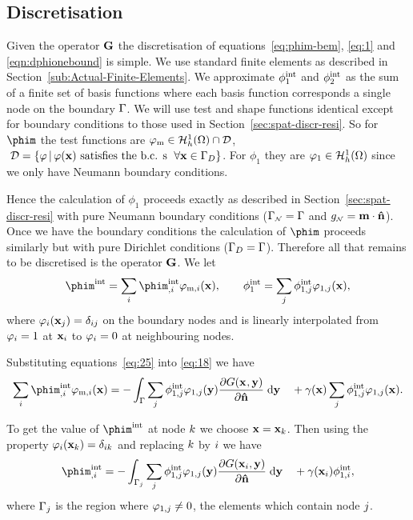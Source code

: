 \subsection{Discretisation}
\label{sec:discretisation}

Given the operator ${\mathbf{G}}$ the discretisation of equations~\eqref{eq:phim-bem}, \eqref{eq:1} and \eqref{eqn:dphionebound} is simple. We use standard finite elements as described in Section~\ref{sub:Actual-Finite-Elements}. We approximate $\phi^{\text{int}}_1$ and $\phi^{\text{int}}_2$ as the sum of a finite set of basis functions where each basis function corresponds a single node on the boundary ${\Gamma}$. We will use test and shape functions identical except for boundary conditions to those used in Section~\ref{sec:spat-discr-resi}. So for $\phim$ the test functions are $\varphi_{\text{m}} \in {\mathcal{H}^1_h(\Omega)} \cap \mathcal{D}$, $\;\mathcal{D} = \{ \varphi \,|\, \varphi(\mathbf{x}) \text{ satisfies the b.c. s } \; \forall \mathbf{x} \in {\Gamma}_D \}$. For $\phi_1$ they are $\varphi_1 \in {\mathcal{H}^1_h(\Omega)}$ since we only have Neumann boundary conditions.

Hence the calculation of $\phi_1$ proceeds exactly as described in Section~\ref{sec:spat-discr-resi} with pure Neumann boundary conditions (${\Gamma}_{\scriptscriptstyle{\mathcal{N}}} = {\Gamma}$ and $g_{\scriptscriptstyle{\mathcal{N}}} = \mathbf{m} \cdot \mathbf{\hat{n}}$). Once we have the boundary conditions the calculation of $\phim$ proceeds similarly but with pure Dirichlet conditions (${\Gamma}_D = {\Gamma}$). Therefore all that remains to be discretised is the operator ${\mathbf{G}}$. We let
\begin{equation}
  \phim^\inte = \sum_\ibasis \phim_{,\ibasis}^\inte \tbf_{\text{m},\ibasis}(\xv),
  \qquad
  \phi^\inte_1 = \sum_\ibasisb \phi^\inte_{1,\ibasisb} \tbf_{1,\ibasisb}(\xv),
  \label{eq:25}
\end{equation}
where $\varphi_{i}(\mathbf{x}_{j}) = \delta_{{i} {j}}$ on the boundary nodes and is linearly interpolated from $\varphi_{i} = 1$ at $\mathbf{x}_{i}$ to $\varphi_{i} = 0$ at neighbouring nodes.

Substituting equations~\eqref{eq:25} into \eqref{eq:18} we have
\begin{equation*}
  \sum_\ibasis \phim_{,\ibasis}^\inte \tbf_{\text{m},\ibasis}(\xv) =
  - \int_{\boundd} \sum_\ibasisb \phi^\inte_{1,\ibasisb} \tbf_{1,\ibasisb}(\yv)
  \pd{\Green}{\nv} \d \yv
  \quad + \gamma(\xv) \sum_\ibasisb \phi^\inte_{1,\ibasisb} \tbf_{1,\ibasisb}(\xv).
\end{equation*}

To get the value of $\phim^\inte$ at node ${k}$ we choose $\mathbf{x} = \mathbf{x}_{k}$. Then using the property $\varphi_{i}(\mathbf{x}_{k}) = \delta_{{i} {k}}$ and replacing ${k}$ by ${i}$ we have
\begin{equation}
  \phim_{,\ibasis}^\inte =
  - \int_{\boundd_\ibasisb} \sum_\ibasisb \phi^\inte_{1,\ibasisb} \tbf_{1,\ibasisb}(\yv)
  \pd{\Green[\ibasis]}{\nv} \d \yv
  \quad + \gamma(\xv_\ibasis) \phi^\inte_{1,\ibasis},
  \label{eq:colocation}
\end{equation}
where ${{\Gamma}_{j}}$ is the region where $\varphi_{1,{j}} \neq 0$, \ie the elements which contain node ${j}$.


